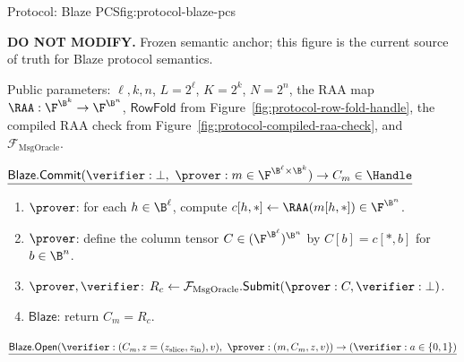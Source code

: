 \begin{protocolbox}{Protocol: Blaze PCS}{fig:protocol-blaze-pcs}
\scriptsize\raggedright
\noindent\textbf{DO NOT MODIFY.} Frozen semantic anchor; this figure is the
current source of truth for Blaze protocol semantics.

\smallskip
\noindent Public parameters: \(\ell,k,n\), \(L=2^\ell\), \(K=2^k\),
\(N=2^n\), the RAA map
\(\RAA:\F^{\B^k}\to\F^{\B^n}\), \(\mathsf{RowFold}\) from
Figure~\ref{fig:protocol-row-fold-handle}, the compiled RAA check from
Figure~\ref{fig:protocol-compiled-raa-check}, and
\(\mathcal F_{\mathrm{MsgOracle}}\).

\smallskip
\noindent\(\underline{\mathsf{Blaze.Commit}(\verifier:\bot,\ \prover:m\in\F^{\B^\ell\times\B^k})\to C_m\in\Handle}\)

\smallskip
\begin{enumerate}[leftmargin=0.24in,label=\textbf{C\arabic*.},itemsep=0.06em,topsep=0.06em,parsep=0pt]
  \item \(\prover\): for each \(h\in\B^\ell\), compute
        \(c[h,\ast]\gets\RAA(m[h,\ast])\in\F^{\B^n}\).
  \item \(\prover\): define the column tensor \(C\in(\F^{\B^\ell})^{\B^n}\)
        by \(C[b]=c[\ast,b]\) for \(b\in\B^n\).
  \item \(\prover,\verifier\): \(R_c\gets
        \mathcal F_{\mathrm{MsgOracle}}.\mathsf{Submit}(\prover:C,\verifier:\bot)\).
  \item \(\mathsf{Blaze}\): return \(C_m=R_c\).
\end{enumerate}

\smallskip
\noindent\(\underline{\mathsf{Blaze.Open}(\verifier:(C_m,z=(z_{\mathrm{slice}},z_{\mathrm{in}}),v),\ \prover:(m,C_m,z,v))\to(\verifier:a\in\{0,1\})}\)


\end{protocolbox}
